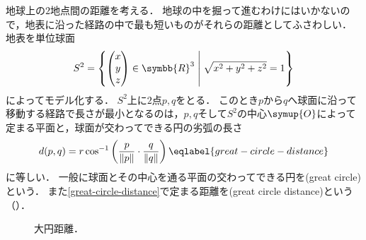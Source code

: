\documentclass{ltjsbook}
\begin{document}
\begin{specialexample}
地球上の\(2\)地点間の距離を考える．
地球の中を掘って進むわけにはいかないので，地表に沿った経路の中で最も短いものがそれらの距離としてふさわしい．
地表を単位球面
\begin{align*}
    S^2 = \left\{ \begin{pmatrix} x \\ y \\ z \end{pmatrix} \in \symbb{R}^3 \relmiddle{|} \sqrt{x^2 + y^2 + z^2} = 1 \right\}
\end{align*}
によってモデル化する．
\(S^2\)上に\(2\)点\(p, q\)をとる．
このとき\(p\)から\(q\)へ球面に沿って移動する経路で長さが最小となるのは，\(p, q\)そして\(S^2\)の中心\(\symup{O}\)によって定まる平面と，球面が交わってできる円の劣弧の長さ
\begin{align}
    d(p, q) = r \cos^{-1}\left(\frac{p}{\lVert p \rVert} \cdot \frac{q}{\lVert q \rVert}\right) \eqlabel{great-circle-distance}
\end{align}
に等しい．
一般に球面とその中心を通る平面の交わってできる円を(great circle)という．
また\eqref{great-circle-distance}で定まる距離を(great circle distance)という（）．
\begin{figure}
    \centering
    
    \caption{大円距離．}
\end{figure}


\end{specialexample}
\end{document}
